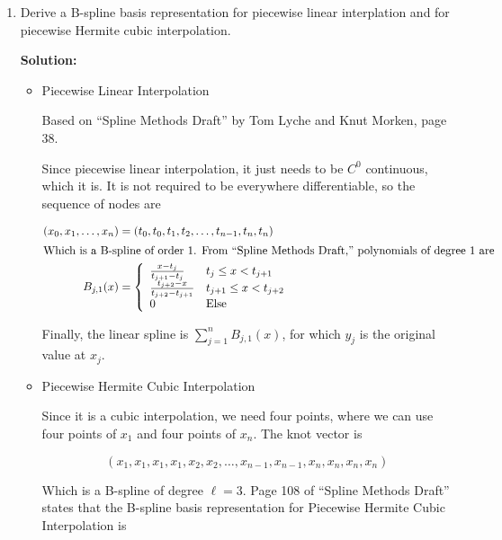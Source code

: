 \documentclass[12pt]{article}
\begin{document}
\begin{enumerate}
\begin{enumerate}
\end{enumerate}

\item Derive a B-spline basis representation for piecewise linear interplation and
for piecewise Hermite cubic interpolation.

{\bf Solution:}

\begin{itemize}

  \item {\sc Piecewise Linear Interpolation}

  Based on ``Spline Methods Draft'' by Tom Lyche and Knut Morken, page 38.

  Since piecewise linear interpolation, it just needs to be $C^{0}$ continuous, which
  it is. It is not required to be everywhere differentiable, so the sequence of nodes
  are

  \begin{align*}
    (x_{0}, x_{1}, \ldots, x_{n}) &= (t_{0}, t_{0}, t_{1}, t_{2}, \ldots, t_{n-1}, t_{n}, t_{n})\\
    \intertext{Which is a B-spline of order 1. From ``Spline Methods Draft,'' polynomials of degree 1 are}
    B_{j,1}(x) &= \left\{ \begin{array}{ll}
                  \frac{x-t_{j}}{t_{j+1} - t_{j}} & t_{j} \leq x < t_{j+1}\\
                  \frac{t_{j+2} - x}{t_{j+2} - t_{j+1}} & t_{j+1} \leq x < t_{j+2}\\
                  0 & \text{Else}
                \end{array}\right.
  \end{align*}

  Finally, the linear spline is $\sum_{j=1}^{n} B_{j,1}(x)$, for which $y_{j}$ is the
  original value at $x_{j}$.

  \item {\sc Piecewise Hermite Cubic Interpolation}

  Since it is a cubic interpolation, we need four points, where we can use
  four points of $x_{1}$ and four points of $x_{n}$. The knot vector is

  \[
      (x_{1}, x_{1}, x_{1}, x_{1}, x_{2}, x_{2}, \ldots, x_{n-1}, x_{n-1}, x_{n}, x_{n}, x_{n}, x_{n})
  \]

  Which is a B-spline of degree $\ell = 3$. Page 108 of ``Spline Methods Draft'' states
  that the B-spline basis representation for Piecewise Hermite Cubic Interpolation is


\end{itemize}
\end{enumerate}
\end{document}
